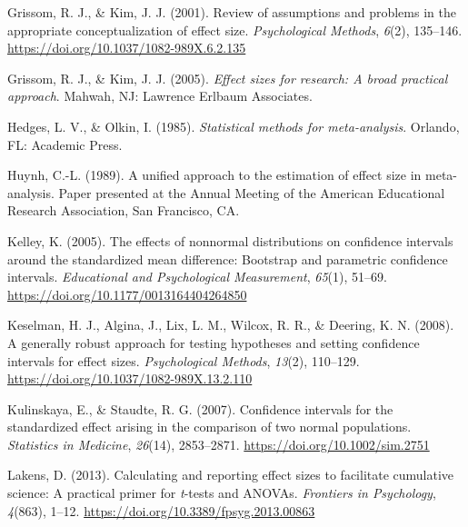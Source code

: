 \documentclass[
  english,
  man,floatsintext]{apa6}
\newlength{\cslhangindent}
\newlength{\cslentryspacingunit} %
\newenvironment{CSLReferences}[2] %
 {%
  \setlength{\parindent}{0pt}
  \ifodd #1
  \let\oldpar\par
  \def\par{\hangindent=\cslhangindent\oldpar}
  \fi
  \setlength{\parskip}{#2\cslentryspacingunit}
 }%
 {}
\begin{document}
\begin{CSLReferences}{1}{0}
\leavevmode{}%
Grissom, R. J., \& Kim, J. J. (2001). Review of assumptions and problems in the appropriate conceptualization of effect size. \emph{Psychological Methods}, \emph{6}(2), 135--146. \url{https://doi.org/10.1037/1082-989X.6.2.135}

\leavevmode{}%
Grissom, R. J., \& Kim, J. J. (2005). \emph{Effect sizes for research: A broad practical approach}. Mahwah, NJ: Lawrence Erlbaum Associates.

\leavevmode{}%
Hedges, L. V., \& Olkin, I. (1985). \emph{Statistical methods for meta-analysis}. Orlando, FL: Academic Press.

\leavevmode{}%
Huynh, C.-L. (1989). A unified approach to the estimation of effect size in meta-analysis. Paper presented at the {A}nnual {M}eeting of the {A}merican {E}ducational {R}esearch {A}ssociation, San Francisco, CA.

\leavevmode{}%
Kelley, K. (2005). The effects of nonnormal distributions on confidence intervals around the standardized mean difference: Bootstrap and parametric confidence intervals. \emph{Educational and Psychological Measurement}, \emph{65}(1), 51--69. \url{https://doi.org/10.1177/0013164404264850}

\leavevmode{}%
Keselman, H. J., Algina, J., Lix, L. M., Wilcox, R. R., \& Deering, K. N. (2008). A generally robust approach for testing hypotheses and setting confidence intervals for effect sizes. \emph{Psychological Methods}, \emph{13}(2), 110--129. \url{https://doi.org/10.1037/1082-989X.13.2.110}

\leavevmode{}%
Kulinskaya, E., \& Staudte, R. G. (2007). Confidence intervals for the standardized effect arising in the comparison of two normal populations. \emph{Statistics in Medicine}, \emph{26}(14), 2853--2871. \url{https://doi.org/10.1002/sim.2751}

\leavevmode{}%
Lakens, D. (2013). Calculating and reporting effect sizes to facilitate cumulative science: A practical primer for \emph{t}-tests and {ANOVAs}. \emph{Frontiers in Psychology}, \emph{4}(863), 1--12. \url{https://doi.org/10.3389/fpsyg.2013.00863}


\end{CSLReferences}
\end{document}
